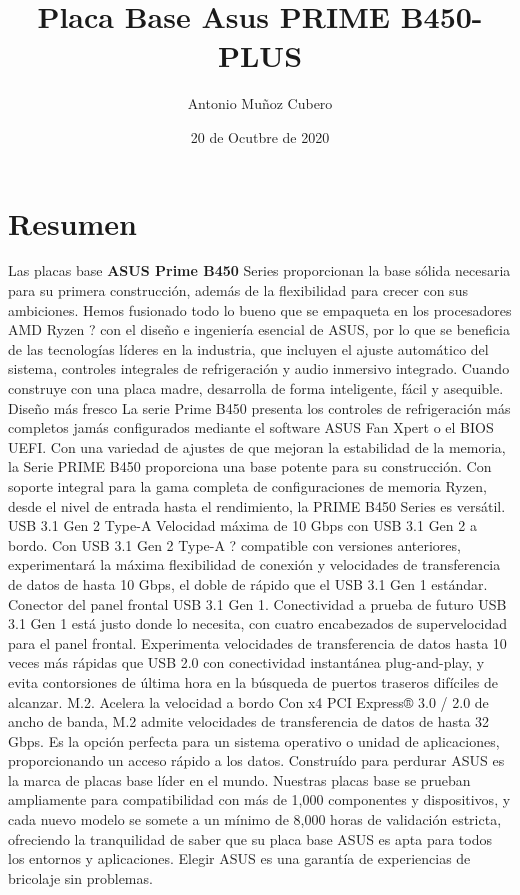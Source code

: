 \documentclass{article}
\title{Placa Base Asus PRIME B450-PLUS}
\author{Antonio Muñoz Cubero}
\date{20 de Ocutbre de 2020}
\begin{document}
\maketitle
\tableofcontents
{}

\newpage
\section{Resumen}

Las placas base \textbf{ASUS Prime B450} Series proporcionan la base sólida necesaria para su primera construcción, además de la flexibilidad para crecer con sus ambiciones. Hemos fusionado todo lo bueno que se empaqueta en los procesadores AMD Ryzen ? con el diseño e ingeniería esencial de ASUS, por lo que se beneficia de las tecnologías líderes en la industria, que incluyen el ajuste automático del sistema, controles integrales de refrigeración y audio inmersivo integrado. Cuando construye con una placa madre, desarrolla de forma inteligente, fácil y asequible.
Diseño más fresco
La serie Prime B450 presenta los controles de refrigeración más completos jamás configurados mediante el software ASUS Fan Xpert o el BIOS UEFI. Con una variedad de ajustes de que mejoran la estabilidad de la memoria, la Serie PRIME B450 proporciona una base potente para su construcción. Con soporte integral para la gama completa de configuraciones de memoria Ryzen, desde el nivel de entrada hasta el rendimiento, la PRIME B450 Series es versátil.
USB 3.1 Gen 2 Type-A
Velocidad máxima de 10 Gbps con USB 3.1 Gen 2 a bordo. Con USB 3.1 Gen 2 Type-A ? compatible con versiones anteriores, experimentará la máxima flexibilidad de conexión y velocidades de transferencia de datos de hasta 10 Gbps, el doble de rápido que el USB 3.1 Gen 1 estándar.
Conector del panel frontal USB 3.1 Gen 1. Conectividad a prueba de futuro
USB 3.1 Gen 1 está justo donde lo necesita, con cuatro encabezados de supervelocidad para el panel frontal. Experimenta velocidades de transferencia de datos hasta 10 veces más rápidas que USB 2.0 con conectividad instantánea plug-and-play, y evita contorsiones de última hora en la búsqueda de puertos traseros difíciles de alcanzar.
M.2. Acelera la velocidad a bordo
Con x4 PCI Express® 3.0 / 2.0 de ancho de banda, M.2 admite velocidades de transferencia de datos de hasta 32 Gbps. Es la opción perfecta para un sistema operativo o unidad de aplicaciones, proporcionando un acceso rápido a los datos.
Construído para perdurar
ASUS es la marca de placas base líder en el mundo. Nuestras placas base se prueban ampliamente para compatibilidad con más de 1,000 componentes y dispositivos, y cada nuevo modelo se somete a un mínimo de 8,000 horas de validación estricta, ofreciendo la tranquilidad de saber que su placa base ASUS es apta para todos los entornos y aplicaciones. Elegir ASUS es una garantía de experiencias de bricolaje sin problemas.
\end{document}
